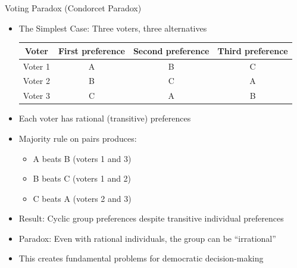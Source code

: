 \documentclass[10pt,handout]{beamer}
\begin{document}
\begin{frame}{Voting Paradox (Condorcet Paradox)}
  \begin{itemize}
    \item The Simplest Case: Three voters, three alternatives
      \begin{table}
        \center
        \begin{tabular}{cccc}
          \toprule
          \textbf{Voter} & \textbf{First preference} & \textbf{Second preference} & \textbf{Third preference} \\
          \midrule
          Voter 1 & A & B & C \\
          Voter 2 & B & C & A \\
          Voter 3 & C & A & B \\
          \bottomrule
        \end{tabular}
      \end{table}
    \item Each voter has rational (transitive) preferences
    \item Majority rule on pairs produces:
      \begin{itemize}
        \item A beats B (voters 1 and 3)
        \item B beats C (voters 1 and 2)
        \item C beats A (voters 2 and 3)
      \end{itemize}
    \item Result: Cyclic group preferences despite transitive individual preferences
    \item Paradox: Even with rational individuals, the group can be ``irrational''
    \item This creates fundamental problems for democratic decision-making
  \end{itemize}
\end{frame}
\end{document}
